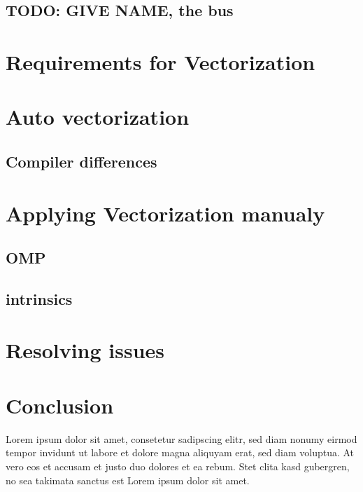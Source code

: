 \documentclass[
	12pt,
	a4paper,
	BCOR10mm,
	DIV14,
	headsepline,
	usegeometry,
]{scrreprt}
\begin{document}
\section{TODO: GIVE NAME, the bus}

\chapter{Requirements for Vectorization}
\chapter{Auto vectorization}
    \section{Compiler differences}

\chapter{Applying Vectorization manualy}
    \section{OMP}
    \section{intrinsics}

\chapter{Resolving issues}
\chapter{Conclusion}
\label{Conclusion}

Lorem ipsum dolor sit amet, consetetur sadipscing elitr, sed diam nonumy eirmod tempor invidunt ut labore et dolore magna aliquyam erat, sed diam voluptua.
At vero eos et accusam et justo duo dolores et ea rebum.
Stet clita kasd gubergren, no sea takimata sanctus est Lorem ipsum dolor sit amet.




\appendix
\appendixpage
\end{document}
